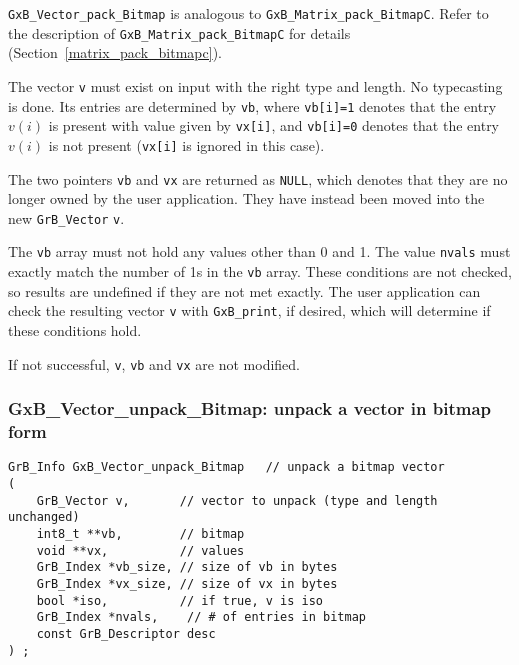 \documentclass[12pt]{article}
\begin{document}
{\noindent
\verb'GxB_Vector_pack_Bitmap' is analogous to
\verb'GxB_Matrix_pack_BitmapC'.  Refer to the description of
\verb'GxB_Matrix_pack_BitmapC' for details
(Section~\ref{matrix_pack_bitmapc}).

The vector \verb'v' must
exist on input with the right type and length.  No typecasting is done.
Its entries are determined by \verb'vb', where \verb'vb[i]=1' denotes that
the entry $v(i)$ is present with value given by \verb'vx[i]', and
\verb'vb[i]=0' denotes that the entry $v(i)$ is not present (\verb'vx[i]' is
ignored in this case).

The two pointers \verb'vb' and \verb'vx' are returned as \verb'NULL', which
denotes that they are no longer owned by the user application.  They have
instead been moved into the new \verb'GrB_Vector' \verb'v'.

The \verb'vb' array must not hold any values other than 0 and 1.  The value
\verb'nvals' must exactly match the number of 1s in the \verb'vb' array.  These
conditions are not checked, so results are undefined if they are not met
exactly.  The user application can check the resulting vector \verb'v' with
\verb'GxB_print', if desired, which will determine if these conditions hold.

If not successful, \verb'v', \verb'vb' and
\verb'vx' are not modified.

\newpage
\subsubsection{{\sf GxB\_Vector\_unpack\_Bitmap:} unpack a vector in bitmap form}
\label{vector_unpack_bitmap}

\begin{mdframed}[userdefinedwidth=6in]
{\footnotesize
\begin{verbatim}
GrB_Info GxB_Vector_unpack_Bitmap   // unpack a bitmap vector
(
    GrB_Vector v,       // vector to unpack (type and length unchanged)
    int8_t **vb,        // bitmap
    void **vx,          // values
    GrB_Index *vb_size, // size of vb in bytes
    GrB_Index *vx_size, // size of vx in bytes
    bool *iso,          // if true, v is iso
    GrB_Index *nvals,    // # of entries in bitmap
    const GrB_Descriptor desc
) ;
\end{verbatim}
} \end{mdframed}

}
\end{document}
